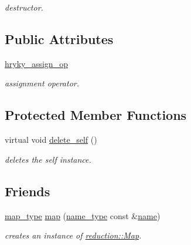 \begin{DoxyCompactItemize}
\begin{DoxyCompactList}\small\item\em destructor. \end{DoxyCompactList}\end{DoxyCompactItemize}
\subsection*{Public Attributes}
\begin{DoxyCompactItemize}
\item 
\hypertarget{classhryky_1_1reduction_1_1_map_a59005870f39062d24645fd88828fd617}{\hyperlink{classhryky_1_1reduction_1_1_map_a59005870f39062d24645fd88828fd617}{hryky\-\_\-assign\-\_\-op}}\label{classhryky_1_1reduction_1_1_map_a59005870f39062d24645fd88828fd617}

\begin{DoxyCompactList}\small\item\em assignment operator. \end{DoxyCompactList}\end{DoxyCompactItemize}
\subsection*{Protected Member Functions}
\begin{DoxyCompactItemize}
\item 
virtual void \hyperlink{classhryky_1_1reduction_1_1_base_a100265b04179500cd7901c8afea64eb0}{delete\-\_\-self} ()
\begin{DoxyCompactList}\small\item\em deletes the self instance. \end{DoxyCompactList}\end{DoxyCompactItemize}
\subsection*{Friends}
\begin{DoxyCompactItemize}
\item 
\hyperlink{namespacehryky_1_1reduction_a64228de3f2cff9ed9d5ad836a120c7f7}{map\-\_\-type} \hyperlink{classhryky_1_1reduction_1_1_map_afa54cde058f8b7cc18099b6bcdbe6e72}{map} (\hyperlink{namespacehryky_1_1reduction_ac686c30a4c8d196bbd0f05629a6b921f}{name\-\_\-type} const \&\hyperlink{classhryky_1_1reduction_1_1_base_a842569265d741905eb8a353d3935f1d1}{name})
\begin{DoxyCompactList}\small\item\em creates an instance of \hyperlink{classhryky_1_1reduction_1_1_map}{reduction\-::\-Map}. \end{DoxyCompactList}\end{DoxyCompactItemize}



